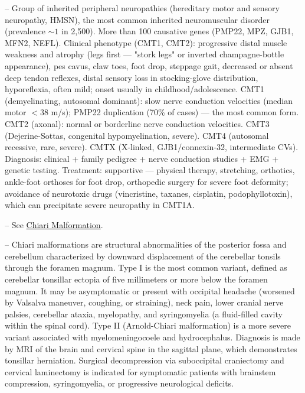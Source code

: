 -- Group of inherited peripheral neuropathies (hereditary motor and sensory neuropathy, HMSN), the most common inherited neuromuscular disorder (prevalence $\sim 1$ in 2,500). More than 100 causative genes (PMP22, MPZ, GJB1, MFN2, NEFL). Clinical phenotype (CMT1, CMT2): progressive distal muscle weakness and atrophy (legs first — "stork legs" or inverted champagne-bottle appearance), pes cavus, claw toes, foot drop, steppage gait, decreased or absent deep tendon reflexes, distal sensory loss in stocking-glove distribution, hyporeflexia, often mild; onset usually in childhood/adolescence. CMT1 (demyelinating, autosomal dominant): slow nerve conduction velocities (median motor $< 38$ m/s); PMP22 duplication (70\% of cases) — the most common form. CMT2 (axonal): normal or borderline nerve conduction velocities. CMT3 (Dejerine-Sottas, congenital hypomyelination, severe). CMT4 (autosomal recessive, rare, severe). CMTX (X-linked, GJB1/connexin-32, intermediate CVs). Diagnosis: clinical + family pedigree + nerve conduction studies + EMG + genetic testing. Treatment: supportive — physical therapy, stretching, orthotics, ankle-foot orthoses for foot drop, orthopedic surgery for severe foot deformity; avoidance of neurotoxic drugs (vincristine, taxanes, cisplatin, podophyllotoxin), which can precipitate severe neuropathy in CMT1A.

-- See \hyperlink{Chiari Malformation}{Chiari Malformation}.

-- Chiari malformations are structural abnormalities of the posterior fossa and cerebellum characterized by downward displacement of the cerebellar tonsils through the foramen magnum. Type I is the most common variant, defined as cerebellar tonsillar ectopia of five millimeters or more below the foramen magnum. It may be asymptomatic or present with occipital headache (worsened by Valsalva maneuver, coughing, or straining), neck pain, lower cranial nerve palsies, cerebellar ataxia, myelopathy, and syringomyelia (a fluid-filled cavity within the spinal cord). Type II (Arnold-Chiari malformation) is a more severe variant associated with myelomeningocoele and hydrocephalus. Diagnosis is made by MRI of the brain and cervical spine in the sagittal plane, which demonstrates tonsillar herniation. Surgical decompression via suboccipital craniectomy and cervical laminectomy is indicated for symptomatic patients with brainstem compression, syringomyelia, or progressive neurological deficits.

